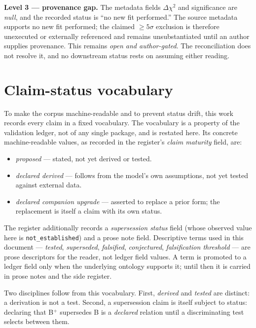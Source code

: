\documentclass[11pt,a4paper]{article}
\begin{document}
\textbf{Level 3 --- provenance gap.} The metadata fields $\Delta\chi^{2}$ and significance are \emph{null}, and the recorded status is ``no new fit performed.'' The source metadata supports no new fit performed; the claimed $\ge 5\sigma$ exclusion is therefore unexecuted or externally referenced and remains unsubstantiated until an author supplies provenance. This remains \emph{open and author-gated}. The reconciliation does not resolve it, and no downstream status rests on assuming either reading.

\section{Claim-status vocabulary}

To make the corpus machine-readable and to prevent status drift, this work records every claim in a fixed vocabulary. The vocabulary is a property of the validation ledger, not of any single package, and is restated here. Its concrete machine-readable values, as recorded in the register's \emph{claim maturity} field, are:

\begin{itemize}
\item \emph{proposed} --- stated, not yet derived or tested.
\item \emph{declared derived} --- follows from the model's own assumptions, not yet tested against external data.
\item \emph{declared companion upgrade} --- asserted to replace a prior form; the replacement is itself a claim with its own status.
\end{itemize}

The register additionally records a \emph{supersession status} field (whose observed value here is \texttt{not\_established}) and a prose note field. Descriptive terms used in this document --- \emph{tested}, \emph{superseded}, \emph{falsified}, \emph{conjectured}, \emph{falsification threshold} --- are prose descriptors for the reader, not ledger field values. A term is promoted to a ledger field only when the underlying ontology supports it; until then it is carried in prose notes and the side register.

Two disciplines follow from this vocabulary. First, \emph{derived} and \emph{tested} are distinct: a derivation is not a test. Second, a supersession claim is itself subject to status: declaring that B$^{+}$ supersedes B is a \emph{declared} relation until a discriminating test selects between them.
\end{document}
